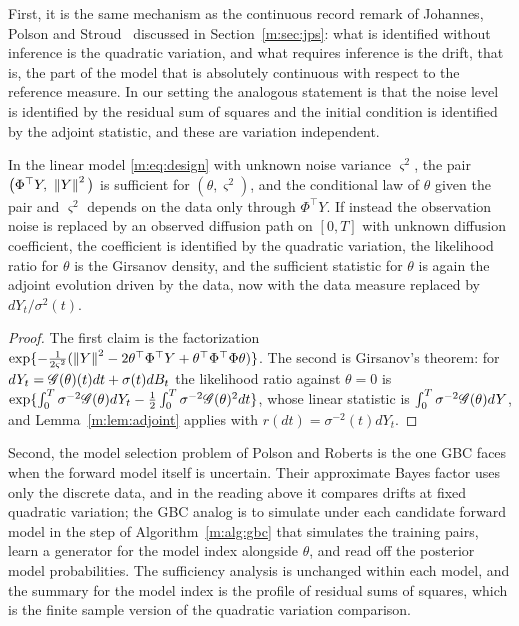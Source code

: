 First, it is the same mechanism as the continuous record remark of Johannes, Polson and Stroud~\cite{jps2009} discussed in Section~\ref{m:sec:jps}: what is identified without inference is the quadratic variation, and what requires inference is the drift, that is, the part of the model that is absolutely continuous with respect to the reference measure. In our setting the analogous statement is that the noise level is identified by the residual sum of squares and the initial condition is identified by the adjoint statistic, and these are variation independent.

\begin{proposition}\label{m:prop:qv}
In the linear model \eqref{m:eq:design} with unknown noise variance $\varsigma^2$, the pair $\big(\Phi^\top Y,\ \norm{Y}^2\big)$ is sufficient for $(\theta,\varsigma^2)$, and the conditional law of $\theta$ given the pair and $\varsigma^2$ depends on the data only through $\Phi^\top Y$. If instead the observation noise is replaced by an observed diffusion path on $[0,T]$ with unknown diffusion coefficient, the coefficient is identified by the quadratic variation, the likelihood ratio for $\theta$ is the Girsanov density, and the sufficient statistic for $\theta$ is again the adjoint evolution driven by the data, now with the data measure replaced by $dY_t/\sigma^2(t)$.
\end{proposition}

\begin{proof}
The first claim is the factorization $\exp\{-\tfrac1{2\varsigma^2}(\left\|Y\right\|^2-2\theta^\top\Phi^\top Y+\theta^\top\Phi^\top\Phi\theta)\}$. The second is Girsanov's theorem: for $dY_t=\mathscr{G}(\theta)(t)dt+\sigma(t)dB_t$ the likelihood ratio against $\theta=0$ is $\exp\{\int_0^T\sigma^{-2}\mathscr{G}(\theta)dY_t-\tfrac12\int_0^T\sigma^{-2}\mathscr{G}(\theta)^2dt\}$, whose linear statistic is $\int_0^T\sigma^{-2}\mathscr{G}(\theta)dY$, and Lemma~\ref{m:lem:adjoint} applies with $r(dt)=\sigma^{-2}(t)dY_t$.
\end{proof}

Second, the model selection problem of Polson and Roberts is the one GBC faces when the forward model itself is uncertain. Their approximate Bayes factor uses only the discrete data, and in the reading above it compares drifts at fixed quadratic variation; the GBC analog is to simulate under each candidate forward model in the step of Algorithm~\ref{m:alg:gbc} that simulates the training pairs, learn a generator for the model index alongside $\theta$, and read off the posterior model probabilities. The sufficiency analysis is unchanged within each model, and the summary for the model index is the profile of residual sums of squares, which is the finite sample version of the quadratic variation comparison.
